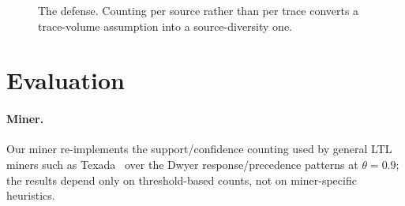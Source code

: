\documentclass[runningheads]{llncs}
\begin{document}
\begin{figure}[t]
\noindent{}
\caption{The defense. Counting per source rather than per trace converts a trace-volume assumption into a source-diversity one.}
\label{alg:defense}
\end{figure}

\section{Evaluation}\label{sec:eval}
\paragraph{Miner.} Our miner re-implements the support/confidence counting used by
general LTL miners such as Texada~\cite{texada} over the Dwyer response/precedence
patterns at $\theta=0.9$; the results depend only on threshold-based counts, not
on miner-specific heuristics.
\end{document}

